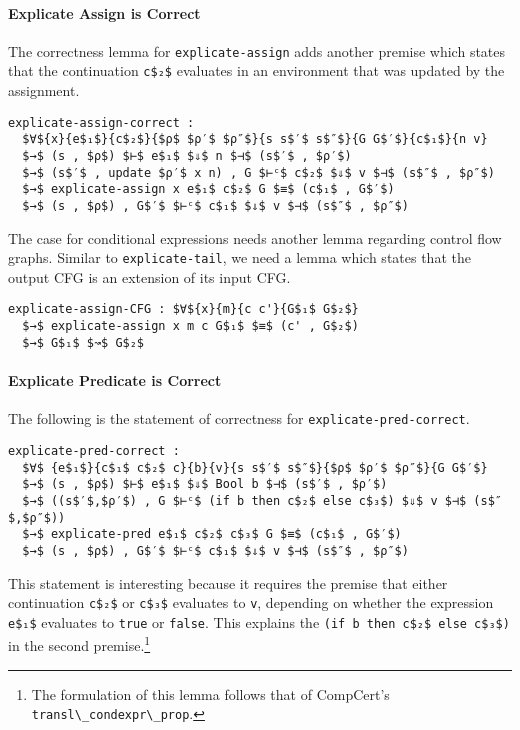 \documentclass[sigplan,screen]{acmart}
\begin{document}
\paragraph{Explicate Assign is Correct}

The correctness lemma for \lstinline{explicate-assign} adds another
premise which states that the continuation \lstinline{c$₂$} evaluates
in an environment that was updated by the assignment.

\begin{lstlisting}
explicate-assign-correct :
  $∀${x}{e$₁$}{c$₂$}{$ρ$ $ρ′$ $ρ″$}{s s$′$ s$″$}{G G$′$}{c$₁$}{n v}
  $→$ (s , $ρ$) $⊢$ e$₁$ $⇓$ n $⊣$ (s$′$ , $ρ′$)
  $→$ (s$′$ , update $ρ′$ x n) , G $⊢ᶜ$ c$₂$ $⇓$ v $⊣$ (s$″$ , $ρ″$)
  $→$ explicate-assign x e$₁$ c$₂$ G $≡$ (c$₁$ , G$′$)
  $→$ (s , $ρ$) , G$′$ $⊢ᶜ$ c$₁$ $⇓$ v $⊣$ (s$″$ , $ρ″$)
\end{lstlisting}

\noindent The case for conditional expressions needs another lemma
regarding control flow graphs. Similar to \lstinline{explicate-tail},
we need a lemma which states that the output CFG is an extension of
its input CFG.

\begin{lstlisting}
explicate-assign-CFG : $∀${x}{m}{c c'}{G$₁$ G$₂$}
  $→$ explicate-assign x m c G$₁$ $≡$ (c' , G$₂$)
  $→$ G$₁$ $↝$ G$₂$
\end{lstlisting}

\paragraph{Explicate Predicate is Correct}

The following is the statement of correctness for
\lstinline{explicate-pred-correct}.

\begin{lstlisting}[basicstyle=\ttfamily\footnotesize]
explicate-pred-correct :
  $∀$ {e$₁$}{c$₁$ c$₂$ c}{b}{v}{s s$′$ s$″$}{$ρ$ $ρ′$ $ρ″$}{G G$′$}
  $→$ (s , $ρ$) $⊢$ e$₁$ $⇓$ Bool b $⊣$ (s$′$ , $ρ′$)
  $→$ ((s$′$,$ρ′$) , G $⊢ᶜ$ (if b then c$₂$ else c$₃$) $⇓$ v $⊣$ (s$″$,$ρ″$))
  $→$ explicate-pred e$₁$ c$₂$ c$₃$ G $≡$ (c$₁$ , G$′$)
  $→$ (s , $ρ$) , G$′$ $⊢ᶜ$ c$₁$ $⇓$ v $⊣$ (s$″$ , $ρ″$)
\end{lstlisting}

\noindent This statement is interesting because it requires the
premise that either continuation \lstinline{c$₂$} or \lstinline{c$₃$}
evaluates to \lstinline{v}, depending on whether the expression
\lstinline{e$₁$} evaluates to \lstinline{true} or
\lstinline{false}. This explains the 
\lstinline{(if b then c$₂$ else c$₃$)} in the second premise.\footnote{The
formulation of this lemma follows that of CompCert's
\lstinline{transl\_condexpr\_prop}.}
\end{document}
